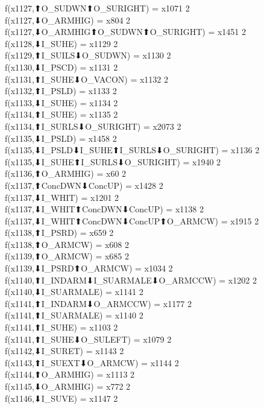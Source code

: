 f(x1127,⬆O_SUDWN⬆O_SURIGHT) = x1071 {2} \\
f(x1127,⬇O_ARMHIG) = x804 {2} \\
f(x1127,⬇O_ARMHIG⬆O_SUDWN⬆O_SURIGHT) = x1451 {2} \\
f(x1128,⬇I_SUHE) = x1129 {2} \\
f(x1129,⬆I_SUILS⬇O_SUDWN) = x1130 {2} \\
f(x1130,⬇I_PSCD) = x1131 {2} \\
f(x1131,⬆I_SUHE⬇O_VACON) = x1132 {2} \\
f(x1132,⬆I_PSLD) = x1133 {2} \\
f(x1133,⬇I_SUHE) = x1134 {2} \\
f(x1134,⬆I_SUHE) = x1135 {2} \\
f(x1134,⬆I_SURLS⬇O_SURIGHT) = x2073 {2} \\
f(x1135,⬇I_PSLD) = x1458 {2} \\
f(x1135,⬇I_PSLD⬇I_SUHE⬆I_SURLS⬇O_SURIGHT) = x1136 {2} \\
f(x1135,⬇I_SUHE⬆I_SURLS⬇O_SURIGHT) = x1940 {2} \\
f(x1136,⬆O_ARMHIG) = x60 {2} \\
f(x1137,⬆ConcDWN⬇ConcUP) = x1428 {2} \\
f(x1137,⬇I_WHIT) = x1201 {2} \\
f(x1137,⬇I_WHIT⬆ConcDWN⬇ConcUP) = x1138 {2} \\
f(x1137,⬇I_WHIT⬆ConcDWN⬇ConcUP⬆O_ARMCW) = x1915 {2} \\
f(x1138,⬆I_PSRD) = x659 {2} \\
f(x1138,⬆O_ARMCW) = x608 {2} \\
f(x1139,⬆O_ARMCW) = x685 {2} \\
f(x1139,⬇I_PSRD⬆O_ARMCW) = x1034 {2} \\
f(x1140,⬆I_INDARM⬇I_SUARMALE⬇O_ARMCCW) = x1202 {2} \\
f(x1140,⬇I_SUARMALE) = x1141 {2} \\
f(x1141,⬆I_INDARM⬇O_ARMCCW) = x1177 {2} \\
f(x1141,⬆I_SUARMALE) = x1140 {2} \\
f(x1141,⬆I_SUHE) = x1103 {2} \\
f(x1141,⬆I_SUHE⬇O_SULEFT) = x1079 {2} \\
f(x1142,⬇I_SURET) = x1143 {2} \\
f(x1143,⬆I_SUEXT⬇O_ARMCW) = x1144 {2} \\
f(x1144,⬆O_ARMHIG) = x1113 {2} \\
f(x1145,⬇O_ARMHIG) = x772 {2} \\
f(x1146,⬇I_SUVE) = x1147 {2} \\
